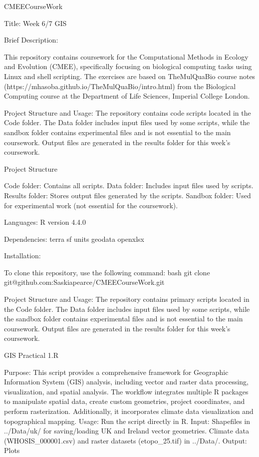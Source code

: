 CMEECourseWork

Title: Week 6/7 GIS

Brief Description:

This repository contains coursework for the Computational Methods in Ecology and Evolution (CMEE), specifically focusing on biological computing tasks using Linux and shell scripting. The exercises are based on TheMulQuaBio course notes (https://mhasoba.github.io/TheMulQuaBio/intro.html) from the Biological Computing course at the Department of Life Sciences, Imperial College London.

Project Structure and Usage: The repository contains code scripts located in the Code folder. The Data folder includes input files used by some scripts, while the sandbox folder contains experimental files and is not essential to the main coursework. Output files are generated in the results folder for this week’s coursework.

Project Structure

    Code folder: Contains all scripts.
    Data folder: Includes input files used by scripts.
    Results folder: Stores output files generated by the scripts.
    Sandbox folder: Used for experimental work (not essential for the coursework).

Languages: 
R version 4.4.0 

Dependencies: 
terra
sf
units
geodata
openxlsx

Installation:

To clone this repository, use the following command:
bash
git clone git@github.com:Saskiapearce/CMEECourseWork.git

Project Structure and Usage:
The repository contains primary scripts located in the Code folder. The Data folder includes input files used by some scripts, while the sandbox folder contains experimental files and is not essential to the main coursework. Output files are generated in the results folder for this week’s coursework.

GIS Practical 1.R

    Purpose: This script provides a comprehensive framework for Geographic Information System 	     (GIS) analysis, including vector and raster data processing, visualization, and spatial analysis. The workflow integrates multiple R packages to manipulate spatial data, create custom geometries, project coordinates, and perform rasterization. Additionally, it incorporates climate data visualization and topographical mapping.
    Usage: Run the script directly in R.
    Input: Shapefiles in ../Data/uk/ for saving/loading UK and Ireland vector geometries.
    Climate data (WHOSIS_000001.csv) and raster datasets (etopo_25.tif) in ../Data/.
    Output:
Plots

